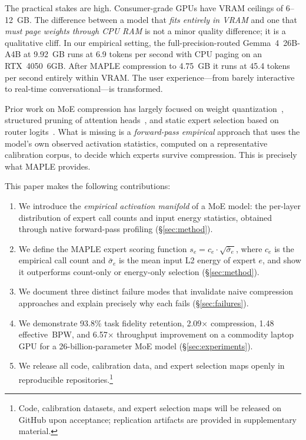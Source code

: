 \documentclass[10pt]{article}
\newcommand{\MAPLE}{\textsc{MAPLE}}
\begin{document}
The practical stakes are high. Consumer-grade GPUs have VRAM ceilings of 6--12~GB. The difference between a model that \emph{fits entirely in VRAM} and one that \emph{must page weights through CPU RAM} is not a minor quality difference; it is a qualitative cliff. In our empirical setting, the full-precision-routed Gemma~4~26B-A4B at 9.92~GB runs at 6.9 tokens per second with CPU paging on an RTX~4050~6GB. After \MAPLE{} compression to 4.75~GB it runs at 45.4 tokens per second entirely within VRAM. The user experience---from barely interactive to real-time conversational---is transformed.

Prior work on MoE compression has largely focused on weight quantization~\cite{frantar2022gptq,lin2024awq}, structured pruning of attention heads~\cite{michel2019sixteen}, and static expert selection based on router logits~\cite{kim2021bert}. What is missing is a \emph{forward-pass empirical} approach that uses the model's own observed activation statistics, computed on a representative calibration corpus, to decide which experts survive compression. This is precisely what \MAPLE{} provides.

This paper makes the following contributions:
\begin{enumerate}[leftmargin=1.5em,topsep=4pt,itemsep=2pt]
  \item We introduce the \emph{empirical activation manifold} of a MoE model: the per-layer distribution of expert call counts and input energy statistics, obtained through native forward-pass profiling (\S\ref{sec:method}).
  \item We define the \MAPLE{} expert scoring function $s_e = c_e \cdot \sqrt{\bar{\sigma}_e}$, where $c_e$ is the empirical call count and $\bar{\sigma}_e$ is the mean input L2 energy of expert $e$, and show it outperforms count-only or energy-only selection (\S\ref{sec:method}).
  \item We document three distinct failure modes that invalidate naive compression approaches and explain precisely why each fails (\S\ref{sec:failures}).
  \item We demonstrate 93.8\% task fidelity retention, 2.09$\times$ compression, 1.48 effective~BPW, and 6.57$\times$ throughput improvement on a commodity laptop GPU for a 26-billion-parameter MoE model (\S\ref{sec:experiments}).
  \item We release all code, calibration data, and expert selection maps openly in reproducible repositories.\footnote{Code, calibration datasets, and expert selection maps will be released on GitHub upon acceptance; replication artifacts are provided in supplementary material.}
\end{enumerate}
\end{document}
